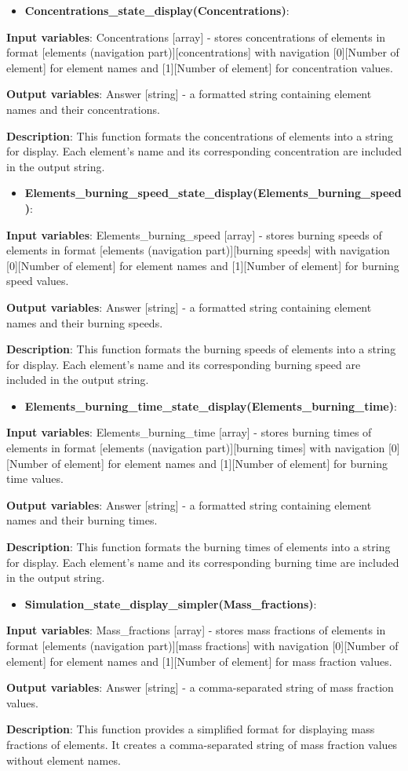 \documentclass[a4paper,12pt]{article}
\newcommand{\namefunction}[4]{
  \begin{itemize}
    \item \textbf{#1}:
  \end{itemize}
  
  \textbf{Input variables}: #2.
  
  \textbf{Output variables}: #4.
  
  \textbf{Description}: #3.
}
\begin{document}
\namefunction{Concentrations\_state\_display(Concentrations)}{Concentrations [array] - stores concentrations of elements in format [elements (navigation part)][concentrations] with navigation [0][Number of element] for element names and [1][Number of element] for concentration values}{This function formats the concentrations of elements into a string for display. Each element's name and its corresponding concentration are included in the output string}{Answer [string] - a formatted string containing element names and their concentrations}

\vspace{1em}

\namefunction{Elements\_burning\_speed\_state\_display(Elements\_burning\_speed)}{Elements\_burning\_speed [array] - stores burning speeds of elements in format [elements (navigation part)][burning speeds] with navigation [0][Number of element] for element names and [1][Number of element] for burning speed values}{This function formats the burning speeds of elements into a string for display. Each element's name and its corresponding burning speed are included in the output string}{Answer [string] - a formatted string containing element names and their burning speeds}

\vspace{1em}

\namefunction{Elements\_burning\_time\_state\_display(Elements\_burning\_time)}{Elements\_burning\_time [array] - stores burning times of elements in format [elements (navigation part)][burning times] with navigation [0][Number of element] for element names and [1][Number of element] for burning time values}{This function formats the burning times of elements into a string for display. Each element's name and its corresponding burning time are included in the output string}{Answer [string] - a formatted string containing element names and their burning times}

\vspace{1em}

\namefunction{Simulation\_state\_display\_simpler(Mass\_fractions)}{Mass\_fractions [array] - stores mass fractions of elements in format [elements (navigation part)][mass fractions] with navigation [0][Number of element] for element names and [1][Number of element] for mass fraction values}{This function provides a simplified format for displaying mass fractions of elements. It creates a comma-separated string of mass fraction values without element names}{Answer [string] - a comma-separated string of mass fraction values}
\end{document}
